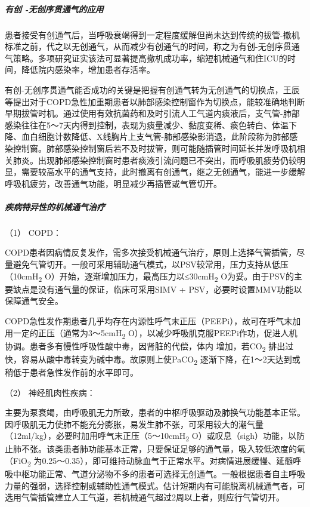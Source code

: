 \subparagraph{有创 -无创序贯通气的应用}

患者接受有创通气后，当呼吸衰竭得到一定程度缓解但尚未达到传统的拔管-撤机标准之前，代之以无创通气，从而减少有创通气的时间，称之为有创-无创序贯通气策略。多项研究证实该法可显著提高撤机成功率，缩短机械通气和住ICU的时间，降低院内感染率，增加患者存活率。

有创-无创序贯通气能否成功的关键是把握有创通气转为无创通气的切换点，王辰等提出对于COPD急性加重期患者以肺部感染控制窗作为切换点，能较准确地判断早期拔管时机。通过使用有效抗菌药和及时引流人工气道内痰液后，支气管-肺部感染往往在5～7天内得到控制，表现为痰量减少、黏度变稀、痰色转白、体温下降、血白细胞计数降低、X线胸片上支气管-肺部感染影消退，此阶段称为肺部感染控制窗。肺部感染控制窗后若不及时拔管，则可能随插管时间延长并发呼吸机相关肺炎。出现肺部感染控制窗时患者痰液引流问题已不突出，而呼吸肌疲劳仍较明显，需要较高水平的通气支持，此时撤离有创通气，继之无创通气，能进一步缓解呼吸机疲劳，改善通气功能，明显减少再插管或气管切开。

\subparagraph{疾病特异性的机械通气治疗}

\hypertarget{text00076.htmlux5cux23CHP3-4-3-2-3-4-1}{}
（1） COPD：

COPD患者因病情反复发作，需多次接受机械通气治疗，原则上选择气管插管，尽量避免气管切开。一般可采用辅助通气模式，以PSV较常用，压力支持从低压（10cmH\textsubscript{2}
O）开始，逐渐增加压力，最高压力以≤30cmH\textsubscript{2}
O为妥。由于PSV的主要缺点是没有通气量的保证，临床可采用SIMV +
PSV，必要时设置MMV功能以保障通气安全。

COPD急性发作期患者几乎均存在内源性呼气末正压（PEEPi），故可在呼气末加用一定的正压（通常为3～5cmH\textsubscript{2}
O），以减少呼吸肌克服PEEPi作功，促进人机协调。患者多有慢性呼吸性酸中毒，因肾脏的代偿，体内{}
增加，若CO\textsubscript{2}
排出过快，容易从酸中毒转变为碱中毒。故原则上使PaCO\textsubscript{2}
逐渐下降，在1～2天达到或稍低于患者急性发作前的水平即可。

\hypertarget{text00076.htmlux5cux23CHP3-4-3-2-3-4-2}{}
（2） 神经肌肉性疾病：

主要为泵衰竭，由呼吸肌无力所致，患者的中枢呼吸驱动及肺换气功能基本正常。因呼吸肌无力使肺不能充分膨胀，易发生肺不张，可采用较大的潮气量（12ml/kg），必要时加用呼气末正压（5～10cmH\textsubscript{2}
O）或叹息（sigh）功能，以防止肺不张。该类患者肺功能基本正常，只要保证足够的通气量，吸入较低浓度的氧（FiO\textsubscript{2}
为0.25～0.35），即可维持动脉血气于正常水平。对病情进展缓慢、延髓呼吸中枢功能正常、气道分泌物不多的患者可选择无创通气。一般根据患者自主呼吸力量的强弱，选择控制或辅助性通气模式。估计短期内有可能脱离机械通气者，可选用气管插管建立人工气道，若机械通气超过2周以上者，则应行气管切开。

